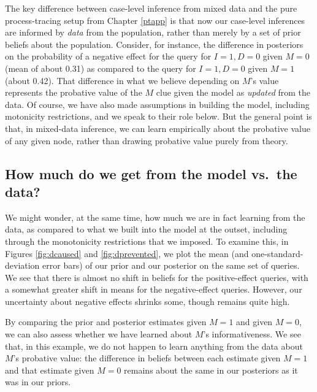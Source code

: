 \documentclass[
  12pt,
]{book}
\begin{document}
The key difference between case-level inference from mixed data and the pure process-tracing setup from Chapter \ref{ptapp} is that now our case-level inferences are informed by \emph{data} from the population, rather than merely by a set of prior beliefs about the population. Consider, for instance, the difference in posteriors on the probability of a negative effect for the query for \(I=1, D=0\) given \(M=0\) (mean of about 0.31) as compared to the query for \(I=1, D=0\) given \(M=1\) (about 0.42). That difference in what we believe depending on \(M\)'s value represents the probative value of the \(M\) clue given the model as \emph{updated} from the data. Of course, we have also made assumptions in building the model, including motonicity restrictions, and we speak to their role below. But the general point is that, in mixed-data inference, we can learn empirically about the probative value of any given node, rather than drawing probative value purely from theory.

\hypertarget{how-much-do-we-get-from-the-model-vs.-the-data}{%
\subsection{How much do we get from the model vs.~the data?}\label{how-much-do-we-get-from-the-model-vs.-the-data}}

We might wonder, at the same time, how much we are in fact learning from the data, as compared to what we built into the model at the outset, including through the monotonicity restrictions that we imposed. To examine this, in Figures \ref{fig:dcaused} and \ref{fig:dprevented}, we plot the mean (and one-standard-deviation error bars) of our prior and our posterior on the same set of queries. We see that there is almost no shift in beliefs for the positive-effect queries, with a somewhat greater shift in means for the negative-effect queries. However, our uncertainty about negative effects shrinks some, though remains quite high.

By comparing the prior and posterior estimates given \(M=1\) and given \(M=0\), we can also assess whether we have learned about \(M\)'s informativeness. We see that, in this example, we do not happen to learn anything from the data about \(M\)'s probative value: the difference in beliefs between each estimate given \(M=1\) and that estimate given \(M=0\) remains about the same in our posteriors as it was in our priors.
\end{document}
